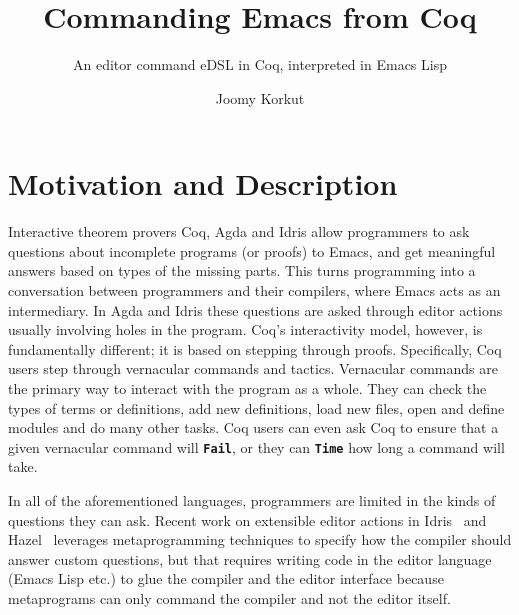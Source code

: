 \documentclass[acmlarge]{acmart}
\newcommand{\IdrisKeyword}[1]{{\textbf{#1}}}
\newcommand{\kw}[1]{\IdrisKeyword{\texttt{#1}}}
\begin{document}
\title{Commanding Emacs from Coq}
\subtitle{An editor command eDSL in Coq, interpreted in Emacs Lisp}

\author{Joomy Korkut}

\renewcommand{\shortauthors}{Joomy Korkut}


\fancyfoot{}
\maketitle
\thispagestyle{empty}
\pagestyle{empty}


\vspace{-1em}
\section{Motivation and Description}

  Interactive theorem provers Coq, Agda and Idris allow programmers to
  ask questions about incomplete programs (or proofs) to Emacs, and get
  meaningful answers based on types of the missing parts.
  This turns programming into a conversation between
  programmers and their compilers, where Emacs acts as an intermediary.
  In Agda and Idris these questions are asked through editor actions usually
  involving holes in the program. Coq's interactivity model, however, is
  fundamentally different; it is based on stepping through proofs.
  Specifically, Coq users step through vernacular commands and tactics.
  Vernacular commands are the primary way to interact with the program as a whole.
  They can check the types of terms or definitions, add new
  definitions, load new files, open and define modules and do many other tasks.
  Coq users can even ask Coq to ensure that a given vernacular command will
  \kw{Fail}, or they can \kw{Time} how long a command will take.

  In all of the aforementioned languages, programmers are limited in the kinds
  of questions they can ask.
  Recent work on extensible editor actions in Idris~\cite{extensible} and
  Hazel~\cite{DBLP:conf/snapl/OmarVHSGAH17,rayObt} leverages
  metaprogramming techniques to specify how the compiler should answer
  custom questions, but that requires writing code in the editor language
  (Emacs Lisp etc.) to glue the compiler and the editor interface because
  metaprograms can only command the compiler and not the editor itself.
\end{document}
